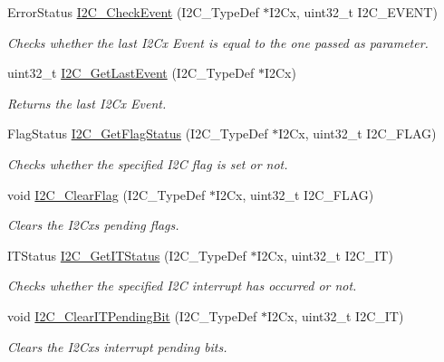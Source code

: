 \begin{DoxyCompactItemize}
Error\+Status \mbox{\hyperlink{group___i2_c_ga2d5701342f9d4c1f09bf9d3cdcacc326}{I2\+C\+\_\+\+Check\+Event}} (I2\+C\+\_\+\+Type\+Def $\ast$I2\+Cx, uint32\+\_\+t I2\+C\+\_\+\+E\+V\+E\+NT)
\begin{DoxyCompactList}\small\item\em Checks whether the last I2\+Cx Event is equal to the one passed as parameter. \end{DoxyCompactList}\item 
uint32\+\_\+t \mbox{\hyperlink{group___i2_c_ga29237aea9b5a3ead33167e1d027e9f1a}{I2\+C\+\_\+\+Get\+Last\+Event}} (I2\+C\+\_\+\+Type\+Def $\ast$I2\+Cx)
\begin{DoxyCompactList}\small\item\em Returns the last I2\+Cx Event. \end{DoxyCompactList}\item 
Flag\+Status \mbox{\hyperlink{group___i2_c_ga15c95d0ed124f029621a2061b1677ee7}{I2\+C\+\_\+\+Get\+Flag\+Status}} (I2\+C\+\_\+\+Type\+Def $\ast$I2\+Cx, uint32\+\_\+t I2\+C\+\_\+\+F\+L\+AG)
\begin{DoxyCompactList}\small\item\em Checks whether the specified I2C flag is set or not. \end{DoxyCompactList}\item 
void \mbox{\hyperlink{group___i2_c_ga9d4f8fe9f7232696114b5578b1223963}{I2\+C\+\_\+\+Clear\+Flag}} (I2\+C\+\_\+\+Type\+Def $\ast$I2\+Cx, uint32\+\_\+t I2\+C\+\_\+\+F\+L\+AG)
\begin{DoxyCompactList}\small\item\em Clears the I2\+Cx\textquotesingle{}s pending flags. \end{DoxyCompactList}\item 
I\+T\+Status \mbox{\hyperlink{group___i2_c_ga447771fbbd94a56f3570b9f430a069ba}{I2\+C\+\_\+\+Get\+I\+T\+Status}} (I2\+C\+\_\+\+Type\+Def $\ast$I2\+Cx, uint32\+\_\+t I2\+C\+\_\+\+IT)
\begin{DoxyCompactList}\small\item\em Checks whether the specified I2C interrupt has occurred or not. \end{DoxyCompactList}\item 
void \mbox{\hyperlink{group___i2_c_ga110dda440fa200b5f77349df19b3e6bb}{I2\+C\+\_\+\+Clear\+I\+T\+Pending\+Bit}} (I2\+C\+\_\+\+Type\+Def $\ast$I2\+Cx, uint32\+\_\+t I2\+C\+\_\+\+IT)
\begin{DoxyCompactList}\small\item\em Clears the I2\+Cx\textquotesingle{}s interrupt pending bits. \end{DoxyCompactList}\end{DoxyCompactItemize}


